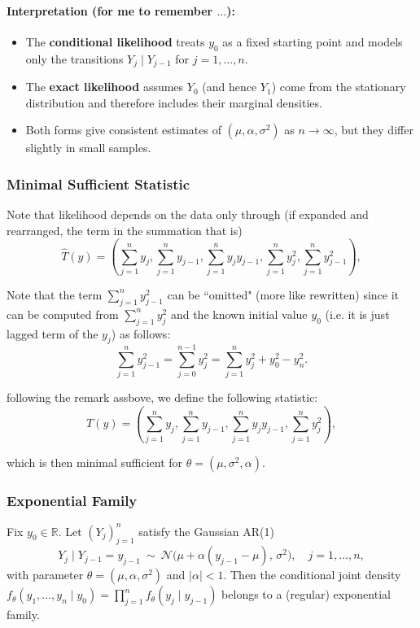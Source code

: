 \paragraph{Interpretation (for me to remember $\ldots$):}
\begin{itemize}
  \item The \textbf{conditional likelihood} treats $y_0$ as a fixed starting point and models only the transitions $Y_j \mid Y_{j-1}$ for $j=1,\dots,n$.
  \item The \textbf{exact likelihood} assumes $Y_0$ (and hence $Y_1$) come from the stationary distribution and therefore includes their marginal densities.
  \item Both forms give consistent estimates of $(\mu,\alpha,\sigma^2)$ as $n\to\infty$, but they differ slightly in small samples.
\end{itemize}

\subsubsection{Minimal Sufficient Statistic}
Note that likelihood depends on the data only through (if expanded and rearranged, the term in the summation that is)
$$\hat{T}(y)=\left(\sum_{j=1}^n y_j, \sum_{j=1}^n y_{j-1}, \sum_{j=1}^n y_j y_{j-1}, \sum_{j=1}^n y_j^2, \sum_{j=1}^n y_{j-1}^2\right),$$

\begin{remark}
    Note that the term $\sum_{j=1}^n y_{j-1}^2$ can be ``omitted" (more like rewritten) since it can be computed from $\sum_{j=1}^n y_j^2$ and the known initial value $y_0$ (i.e. it is just 
    lagged term of the $y_j$) as follows:
    $$\sum_{j=1}^n y_{j-1}^2 = \sum_{j=0}^{n-1} y_j^2 = \sum_{j=1}^{n} y_j^2 + y_0^2 - y_n^2.$$
\end{remark}

following the remark assbove, we define the following statistic:
\vspace{0.2cm}
$$T(y)=\left(\sum_{j=1}^n y_j, \sum_{j=1}^n y_{j-1}, \sum_{j=1}^n y_j y_{j-1}, \sum_{j=1}^n y_j^2\right),$$
\vspace{0.2cm}

which is then minimal sufficient for $\theta=(\mu,\sigma^2,\alpha)$.

\subsubsection*{Exponential Family}

\begin{theorem}
Fix $y_0\in\mathbb R$. Let $(Y_j)_{j=1}^n$ satisfy the Gaussian AR(1)
\[
Y_j \mid Y_{j-1}=y_{j-1}\ \sim\ \mathcal N\!\big(\mu+\alpha(y_{j-1}-\mu),\,\sigma^2\big),
\quad j=1,\dots,n,
\]
with parameter $\theta=(\mu,\alpha,\sigma^2)$ and $|\alpha|<1$. Then the conditional joint density
$f_\theta(y_1,\dots,y_n\mid y_0)=\prod_{j=1}^n f_\theta(y_j\mid y_{j-1})$ belongs to a (regular) exponential family.
\end{theorem}

